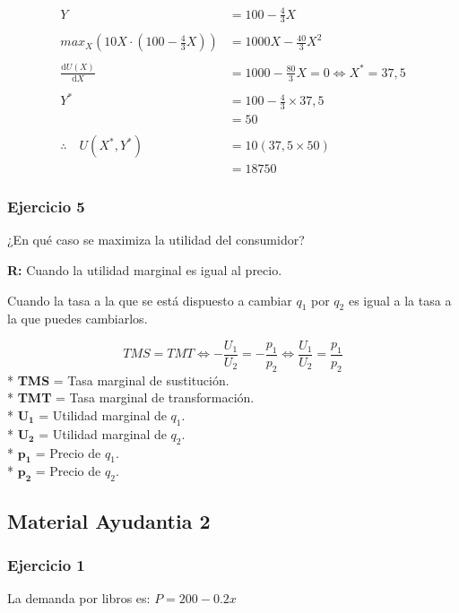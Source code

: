 \documentclass{templateNote}
\begin{document}
\begin{align*}
    Y &= 100 - \frac{4}{3}X \\
    \\
    max_{X} (10 X \cdot (100 - \frac{4}{3}X)) &= 1000X - \frac{40}{3} {X}^2 \\
    \\
    \frac{\mathrm{d} U(X)}{\mathrm{d}X} &= 1000 - \frac{80}{3}X = 0 \Leftrightarrow {X}^* = 37,5 \\
    \\
    {Y}^* &= 100 - \frac{4}{3} \times 37,5 \\
    &= 50 \\
    \\
    \therefore \quad U({X}^*, {Y}^*) &= 10 (37,5 \times 50) \\
    &= 18750
\end{align*}

\subsubsection{Ejercicio 5}
\indent
¿En qué caso se maximiza la utilidad del consumidor?

\textbf{R:} Cuando la utilidad marginal es igual al precio.

Cuando la tasa a la que se está dispuesto a cambiar $q_1$ por $q_2$ es igual a la tasa a la que
puedes cambiarlos.

\begin{equation*}
    TMS = TMT \Leftrightarrow - \frac{U_1}{U_2} = - \frac{p_1}{p_2} \Leftrightarrow \frac{U_1}{U_2} = \frac{p_1}{p_2}
\end{equation*}
* \textbf{TMS} = Tasa marginal de sustitución.\\
* \textbf{TMT} = Tasa marginal de transformación.\\
* $\mathbf{U_1}$ = Utilidad marginal de $q_1$.\\
* $\mathbf{U_2}$ = Utilidad marginal de $q_2$.\\
* $\mathbf{p_1}$ = Precio de $q_1$.\\
* $\mathbf{p_2}$ = Precio de $q_2$.\\

\newpage
\subsection{Material Ayudantia 2}
\subsubsection{Ejercicio 1}
\indent
La demanda por libros es: $P = 200 -0.2x$
\end{document}
